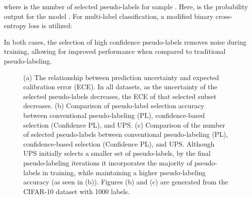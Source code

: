 \documentclass{article} \usepackage{iclr2021_conference,times}
\begin{document}
where  is the number of selected pseudo-labels for sample . Here,  is the probability output for the model . For multi-label classification, a modified binary cross-entropy loss is utilized:

In both cases, the selection of high confidence pseudo-labels removes noise during training, allowing for improved performance when compared to traditional pseudo-labeling.



\begin{figure}

\vspace{-4mm}
    \centering
    \hspace*{-0.4em}
\hspace*{-0.4em}
\label{fig:example}\caption{(a) The relationship between prediction uncertainty and expected calibration error (ECE). In all datasets, as the uncertainty of the selected pseudo-labels decreases, the ECE of that selected subset decreases. (b) Comparison of pseudo-label selection accuracy between conventional pseudo-labeling (PL), confidence-based selection (Confidence PL),  and UPS. (c) Comparison of the number of selected pseudo-labels between conventional pseudo-labeling (PL), confidence-based selection (Confidence PL), and UPS.  Although UPS initially selects a smaller set of pseudo-labels, by the final pseudo-labeling iterations it incorporates the majority of pseudo-labels in training, while maintaining a higher pseudo-labeling accuracy (as seen in (b)). Figures (b) and (c) are generated from the CIFAR-10 dataset with 1000 labels.}
    \vspace{-4mm}
    
\end{figure}
\end{document}
